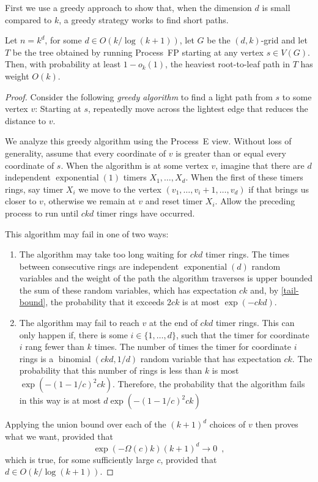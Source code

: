 \documentclass{patmorin}
\DeclareMathOperator{\exponential}{exponential}
\DeclareMathOperator{\binomial}{binomial}
\begin{document}
First we use a greedy approach to show that, when the dimension $d$
is small compared to $k$, a greedy strategy works to find short paths.

\begin{thm}
   Let $n=k^d$, for some $d\in O(k/\log(k+1))$, let $G$ be the $(d,k)$-grid
   and let $T$ be the tree obtained by running Process~FP starting at
   any vertex $s\in V(G)$.  Then, with probability at least $1-o_k(1)$,
   the heaviest root-to-leaf path in $T$ has weight $O(k)$.
\end{thm}

\begin{proof}
   Consider the following \emph{greedy algorithm} to find a light path
   from $s$ to some vertex $v$:  Starting at $s$, repeatedly
   move across the lightest edge that reduces the distance to $v$.

   We analyze this greedy algorithm using the Process~E view. Without
   loss of generality, assume that every coordinate of $v$ is greater
   than or equal every coordinate of $s$.  When the algorithm is at some
   vertex $v$, imagine that there are $d$ independent $\exponential(1)$
   timers $X_1,\ldots,X_d$. When the first of these timers rings, say
   timer $X_i$ we move to the vertex $(v_1,\ldots,v_{i}+1,\ldots,v_d)$
   if that brings us closer to $v$, otherwise we remain at $v$ and reset
   timer $X_i$.  
   Allow the preceding process to run until $ckd$ timer rings have
   occurred.  

   This algorithm may fail in one of two ways:
   \begin{enumerate}
      \item The algorithm may take too long waiting for $ckd$ timer
       rings.  The times between consecutive rings are independent
       $\exponential(d)$ random variables and the weight of the path
       the algorithm traverses is upper bounded the sum of these random
       variables, which has expectation $ck$ and, by \eqref{tail-bound},
       the probability that it exceeds $2ck$ is at most $\exp(-ckd)$.

      \item The algorithm may fail to reach $v$ at the end of $ckd$ timer
      rings.  This can only happen if, there is some $i\in\{1,\ldots,d\}$,
      such that the timer for coordinate $i$ rang fewer than $k$ times.
      The number of times the timer for coordinate $i$ rings is a
      $\binomial(ckd,1/d)$ random variable that has expectation $ck$.
      The probability that this number of rings is less than $k$ is
      most $\exp(-(1-1/c)^2ck)$.  Therefore, the probability that the 
      algorithm fails in this way is at most $d\exp(-(1-1/c)^2ck)$
   \end{enumerate} 

   Applying the union bound over each of the $(k+1)^{d}$ choices of $v$
   then proves what we want, provided that
   \[
         \exp(-\Omega(c)k) (k+1)^d \to 0 \enspace ,
   \]
   which is true, for some sufficiently large $c$, provided that $d\in O(k/\log (k+1))$.
\end{proof}
\end{document}
